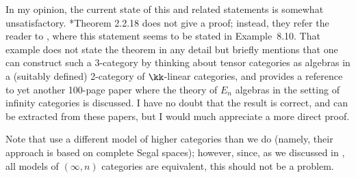 \begin{remark}
  In my opinion, the current state of this and related statements is somewhat
  unsatisfactory. *{Theorem 2.2.18} does not give a
  proof; instead, they refer the reader to , where this statement
  seems to be stated in Example~8.10. That example does not state the theorem in
  any detail but briefly mentions that one can construct such a 3-category by
  thinking about tensor categories as algebras in a (suitably defined)
  2-category of $\kk$-linear categories, and provides a reference to yet another
  100-page paper where the theory of $E_n$ algebras in the setting of infinity
  categories is discussed. I have no doubt that the result is correct, and
  can be extracted from these papers, but I would much appreciate a
  more direct proof.
\end{remark}


Note that  use a different model of higher categories than we do
(namely, their approach is based on complete Segal spaces); however, since, as
we discussed in , all models of $(\infty,n)$ categories are equivalent,
this should not be a problem.
